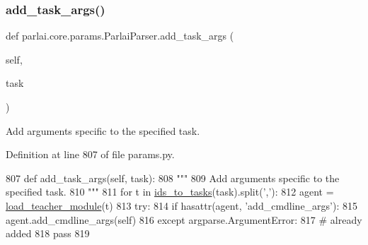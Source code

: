 \mbox{\label{classparlai_1_1core_1_1params_1_1ParlaiParser_a61ff766a70bd11365cbcbf71431ce527}} 
\subsubsection{\texorpdfstring{add\+\_\+task\+\_\+args()}{add\_task\_args()}}
{\footnotesize\ttfamily def parlai.\+core.\+params.\+Parlai\+Parser.\+add\+\_\+task\+\_\+args (\begin{DoxyParamCaption}\item[{}]{self,  }\item[{}]{task }\end{DoxyParamCaption})}

\begin{DoxyVerb}Add arguments specific to the specified task.
\end{DoxyVerb}
 

Definition at line 807 of file params.\+py.


\begin{DoxyCode}
807     \textcolor{keyword}{def }add\_task\_args(self, task):
808         \textcolor{stringliteral}{"""}
809 \textcolor{stringliteral}{        Add arguments specific to the specified task.}
810 \textcolor{stringliteral}{        """}
811         \textcolor{keywordflow}{for} t \textcolor{keywordflow}{in} \hyperlink{namespaceparlai_1_1tasks_1_1tasks_ad536d1295ca5ba2ecf3a48635b482087}{ids\_to\_tasks}(task).split(\textcolor{stringliteral}{','}):
812             agent = \hyperlink{namespaceparlai_1_1core_1_1loader_a9eed9fa0f15170da9d4de24c2c3d4e2a}{load\_teacher\_module}(t)
813             \textcolor{keywordflow}{try}:
814                 \textcolor{keywordflow}{if} hasattr(agent, \textcolor{stringliteral}{'add\_cmdline\_args'}):
815                     agent.add\_cmdline\_args(self)
816             \textcolor{keywordflow}{except} argparse.ArgumentError:
817                 \textcolor{comment}{# already added}
818                 \textcolor{keywordflow}{pass}
819 
\end{DoxyCode}
\mbox{\label{classparlai_1_1core_1_1params_1_1ParlaiParser_a72da297485838e9633cb0fc86d177cf8}} 
